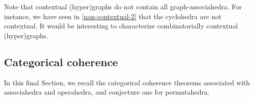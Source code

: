 
\begin{rem}
  Note that contextual (hyper)graphs do not contain all graph-associahedra.
  For instance, we have seen in \cref{non-contextual-2} that the cyclohedra are not contextual. 
  It would be interesting to characterize combinatorially contextual (hyper)graphs.
\end{rem}



\subsection{Categorical coherence}
\label{ss:coherence}

In this final Section, we recall the categorical coherence theorems associated with associahedra and operahedra, and conjecture one for permutahedra.


